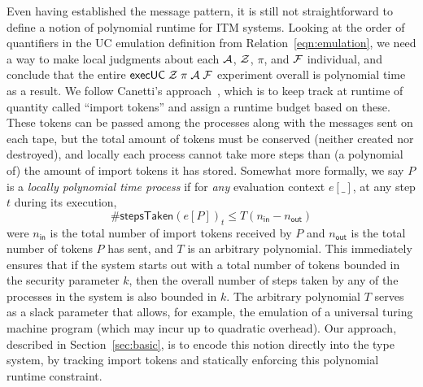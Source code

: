 Even having established the message pattern, it is still not straightforward to define a notion of polynomial runtime for ITM systems.
Looking at the order of quantifiers in the UC emulation definition from Relation~\ref{eqn:emulation}, we need a way to make local judgments about each $\mathcal{A}$, $\mathcal{Z}$, $\pi$, and $\mathcal{F}$ individual, and conclude that the entire ${\mathsf {execUC}} \; \mathcal{Z} \; \pi \; \mathcal{A} \; \mathcal{F}$ experiment overall is polynomial time as a result.
We follow Canetti's approach~\cite{canettiUC}, which is to keep track at runtime of quantity called ``import tokens'' and assign a runtime budget based on these.
These tokens can be passed among the processes along with the messages sent on each tape, but the total amount of tokens must be conserved (neither created nor destroyed), and locally each process cannot take more steps than (a polynomial of) the amount of import tokens it has stored.
Somewhat more formally, we say $P$ is a \emph{locally polynomial time process} if for \emph{any} evaluation context $e[\_]$, at any step $t$ during its execution,
\[
\#\textsf{stepsTaken}(e[P])_{t} \le T(n_{\textsf{in}} - n_{\textsf{out}})
\]
were $n_{\textsf{in}}$ is the total number of import tokens received by $P$ and $n_{\textsf{out}}$ is the total number of tokens $P$ has sent, and $T$ is an arbitrary polynomial.
This immediately ensures that if the system starts out with a total number of tokens bounded in the security parameter $k$, then the overall number of steps taken by any of the processes in the system is also bounded in $k$.
The arbitrary polynomial $T$ serves as a slack parameter that allows, for example, the emulation of a universal turing machine program (which may incur up to quadratic overhead).
Our approach, described in Section~\ref{sec:basic}, is to encode this notion directly into the type system, by tracking import tokens and statically enforcing this polynomial runtime constraint.


